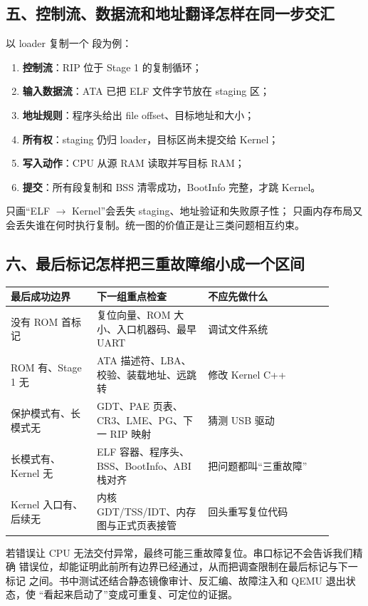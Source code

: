 \subsection{五、控制流、数据流和地址翻译怎样在同一步交汇}

以 loader 复制一个  段为例：

\begin{enumerate}[leftmargin=2.2em]
  \item \textbf{控制流}：RIP 位于 Stage 1 的复制循环；
  \item \textbf{输入数据流}：ATA 已把 ELF 文件字节放在 staging 区；
  \item \textbf{地址规则}：程序头给出 file offset、目标地址和大小；
  \item \textbf{所有权}：staging 仍归 loader，目标区尚未提交给 Kernel；
  \item \textbf{写入动作}：CPU 从源 RAM 读取并写目标 RAM；
  \item \textbf{提交}：所有段复制和 BSS 清零成功，BootInfo 完整，才跳 Kernel。
\end{enumerate}

只画“ELF \(\rightarrow\) Kernel”会丢失 staging、地址验证和失败原子性；
只画内存布局又会丢失谁在何时执行复制。统一图的价值正是让三类问题相互约束。

\subsection{六、最后标记怎样把三重故障缩小成一个区间}

\begin{longtable}{L{0.24\linewidth}L{0.31\linewidth}L{0.35\linewidth}}
\toprule
最后成功边界 & 下一组重点检查 & 不应先做什么 \\
\midrule
没有 ROM 首标记 & 复位向量、ROM 大小、入口机器码、最早 UART & 调试文件系统 \\
ROM 有、Stage 1 无 & ATA 描述符、LBA、校验、装载地址、远跳转 & 修改 Kernel C++ \\
保护模式有、长模式无 & GDT、PAE 页表、CR3、LME、PG、下一 RIP 映射 & 猜测 USB 驱动 \\
长模式有、Kernel 无 & ELF 容器、程序头、BSS、BootInfo、ABI 栈对齐 & 把问题都叫“三重故障” \\
Kernel 入口有、后续无 & 内核 GDT/TSS/IDT、内存图与正式页表接管 & 回头重写复位代码 \\
\bottomrule
\end{longtable}

若错误让 CPU 无法交付异常，最终可能三重故障复位。串口标记不会告诉我们精确
错误位，却能证明此前所有边界已经通过，从而把调查限制在最后标记与下一标记
之间。书中测试还结合静态镜像审计、反汇编、故障注入和 QEMU 退出状态，使
“看起来启动了”变成可重复、可定位的证据。
